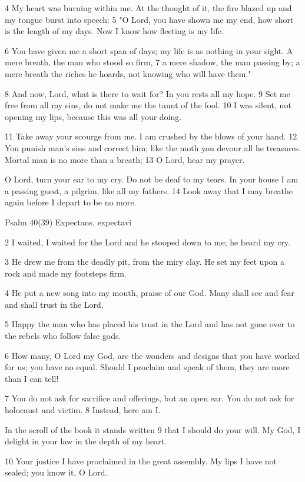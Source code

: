 4 My heart was burning within me.
At the thought of it, the fire blazed up
and my tongue burst into speech:
5 "O Lord, you have shown me my end,
how short is the length of my days.
Now I know how fleeting is my life.

6 You have given me a short span of days;
my life is as nothing in your sight.
A mere breath, the man who stood so firm,
7 a mere shadow, the man passing by;
a mere breath the riches he hoards,
not knowing who will have them."

8 And now, Lord, what is there to wait for?
In you rests all my hope.
9 Set me free from all my sins,
do not make me the taunt of the fool.
10 I was silent, not opening my lips,
because this was all your doing.

11 Take away your scourge from me.
I am crushed by the blows of your hand.
12 You punish man's sins and correct him;
like the moth you devour all he treasures.
Mortal man is no more than a breath;
13 O Lord, hear my prayer.

O Lord, turn your ear to my cry.
Do not be deaf to my tears.
In your house I am a passing guest,
a pilgrim, like all my fathers.
14 Look away that I may breathe again
before I depart to be no more.


Psalm 40(39) Expectans, expectavi

2 I waited, I waited for the Lord
and he stooped down to me;
he heard my cry.

3 He drew me from the deadly pit,
from the miry clay.
He set my feet upon a rock
and made my footsteps firm.

4 He put a new song into my mouth,
praise of our God.
Many shall see and fear
and shall trust in the Lord.

5 Happy the man who has placed
his trust in the Lord
and has not gone over to the rebels
who follow false gods.

6 How many, O Lord my God,
are the wonders and designs
that you have worked for us;
you have no equal.
Should I proclaim and speak of them,
they are more than I can tell!

7 You do not ask for sacrifice and offerings,
but an open ear.
You do not ask for holocaust and victim.
8 Instead, here am I.

In the scroll of the book it stands written
9 that I should do your will.
My God, I delight in your law
in the depth of my heart.

10 Your justice I have proclaimed
in the great assembly.
My lips I have not sealed;
you know it, O Lord.

